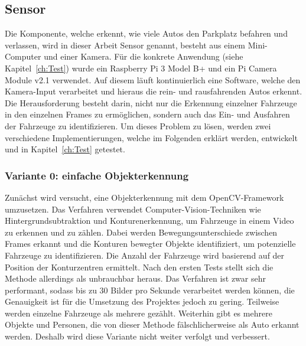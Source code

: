\subsection{Sensor}\label{ch:Umsetzung_Sensor}

Die Komponente, welche erkennt, wie viele Autos den Parkplatz befahren und verlassen, wird in dieser Arbeit Sensor genannt, besteht aus einem Mini-Computer und einer Kamera.
Für die konkrete Anwendung (siehe Kapitel~\ref{ch:Test}) wurde ein Raspberry Pi 3 Model B+ und ein Pi Camera Module v2.1 verwendet.
Auf diesem läuft kontinuierlich eine Software, welche den Kamera-Input verarbeitet und hieraus die rein- und rausfahrenden Autos erkennt.
Die Herausforderung besteht darin, nicht nur die Erkennung einzelner Fahrzeuge in den einzelnen Frames zu ermöglichen, sondern auch das Ein- und Ausfahren der Fahrzeuge zu identifizieren.
Um dieses Problem zu lösen, werden zwei verschiedene Implementierungen, welche im Folgenden erklärt werden, entwickelt und in Kapitel~\ref{ch:Test} getestet.

\subsubsection{Variante 0: einfache Objekterkennung}\label{ch:Sensor_v0}
Zunächst wird versucht, eine Objekterkennung mit dem OpenCV-Framework umzusetzen.
Das Verfahren verwendet Computer-Vision-Techniken wie Hintergrundsubtraktion und Konturen\-erkennung, um Fahrzeuge in einem Video zu erkennen und zu zählen.
Dabei werden Bewegungsunterschiede zwischen Frames erkannt und die Konturen bewegter Objekte identifiziert, um potenzielle Fahrzeuge zu identifizieren.
Die Anzahl der Fahrzeuge wird basierend auf der Position der Konturzentren ermittelt.
Nach den ersten Tests stellt sich die Methode allerdings als unbrauchbar heraus.
Das Verfahren ist zwar sehr performant, sodass bis zu 30 Bilder pro Sekunde verarbeitet werden können, die Genauigkeit ist für die Umsetzung des Projektes jedoch zu gering.
Teilweise werden einzelne Fahrzeuge als mehrere gezählt.
Weiterhin gibt es mehrere Objekte und Personen, die von dieser Methode fälschlicherweise als Auto erkannt werden.
Deshalb wird diese Variante nicht weiter verfolgt und verbessert.

